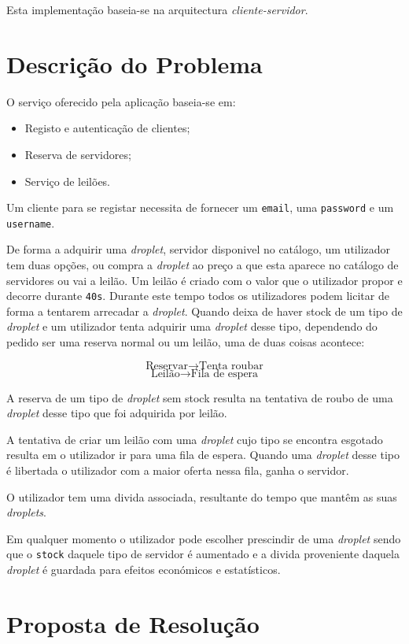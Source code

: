 \documentclass[a4paper]{article}
\begin{document}
Esta implementação baseia-se na arquitectura \textit{cliente-servidor}.


\section{Descrição do Problema}
O serviço oferecido pela aplicação baseia-se em:
\begin{itemize}
  \item Registo e autenticação de clientes;
  \item Reserva de servidores;
  \item Serviço de leilões.
\end{itemize}

Um cliente para se registar necessita de fornecer um \texttt{email}, uma \texttt{password} e um \texttt{username}.

De forma a adquirir uma \textit{droplet}, servidor disponivel no catálogo, um utilizador tem duas opções, ou compra a \textit{droplet} ao preço a que esta aparece no catálogo de servidores ou vai a leilão. Um leilão é criado com o valor que o utilizador propor e decorre durante \texttt{40s}. Durante este tempo todos os utilizadores podem licitar de forma a tentarem arrecadar a \textit{droplet}.
Quando deixa de haver stock de um tipo de \textit{droplet} e um utilizador tenta adquirir uma \textit{droplet} desse tipo, dependendo do pedido ser uma reserva normal ou um leilão, uma de duas coisas acontece:

$$\textrm{Reservar} \rightarrow \textrm{Tenta roubar}$$
$$\textrm{Leilão} \rightarrow \textrm{Fila de espera}$$

A reserva de um tipo de \textit{droplet} sem stock resulta na tentativa de roubo de uma \textit{droplet} desse tipo que foi adquirida por leilão.

A tentativa de criar um leilão com uma \textit{droplet} cujo tipo se encontra esgotado resulta em o utilizador ir para uma fila de espera. Quando uma \textit{droplet} desse tipo é libertada o utilizador com a maior oferta nessa fila, ganha o servidor.

O utilizador tem uma divida associada, resultante do tempo que mantêm as suas \textit{droplets}.

Em qualquer momento o utilizador pode escolher prescindir de uma \textit{droplet} sendo que o \texttt{stock} daquele tipo de servidor é aumentado e a divida proveniente daquela \textit{droplet} é guardada para efeitos económicos e estatísticos.

\section{Proposta de Resolução}
\end{document}
